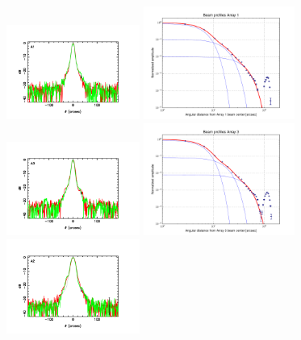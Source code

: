 \begin{figure}[ht!]
  \begin{center}
    \includegraphics[clip=true, width=0.39\textwidth]{Figures/Array_A1_dB.pdf}
    \includegraphics[clip=true, trim={-0.5cm, -0.65cm, 0, 0}, width=0.44\textwidth]{Figures/Beam_profiles_A1_FR.pdf}
    \includegraphics[clip=true, width=0.39\textwidth]{Figures/Array_A3_dB.pdf}
    \includegraphics[clip=true, trim={-0.5cm, -0.65cm, 0, 0}, width=0.44\textwidth]{Figures/Beam_profiles_A3_FR.pdf}
    \includegraphics[clip=true, width=0.39\textwidth]{Figures/Array_A2_dB.pdf}

\end{center}
\end{figure}
